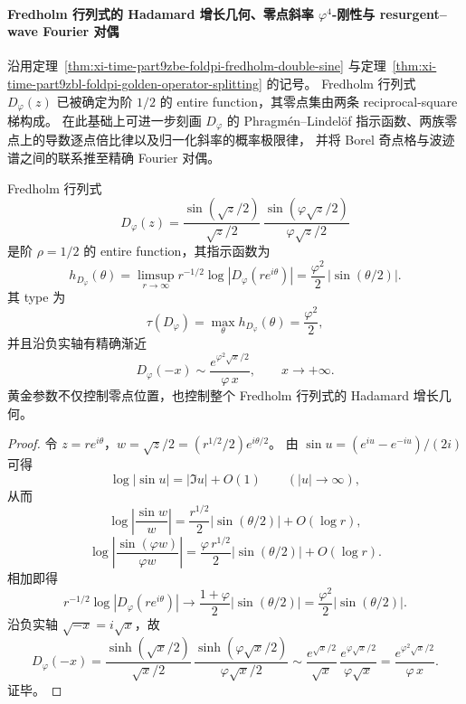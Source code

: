 \paragraph{Fredholm 行列式的 Hadamard 增长几何、零点斜率 \texorpdfstring{$\varphi^4$}{phi4}-刚性与 resurgent--wave Fourier 对偶}
沿用定理~\ref{thm:xi-time-part9zbe-foldpi-fredholm-double-sine}
与定理~\ref{thm:xi-time-part9zbl-foldpi-golden-operator-splitting} 的记号。
Fredholm 行列式 \(D_\varphi(z)\) 已被确定为阶 \(1/2\) 的 entire function，其零点集由两条 reciprocal-square 梯构成。
在此基础上可进一步刻画 \(D_\varphi\) 的 Phragm\'en--Lindel\"of 指示函数、两族零点上的导数逐点倍比律以及归一化斜率的概率极限律，
并将 Borel 奇点格与波迹谱之间的联系推至精确 Fourier 对偶。

\begin{theorem}\label{thm:xi-time-part9zbm-foldpi-hadamard-indicator}
Fredholm 行列式
\[
D_\varphi(z)
=
\frac{\sin(\sqrt z/2)}{\sqrt z/2}\,
\frac{\sin(\varphi\sqrt z/2)}{\varphi\sqrt z/2}
\]
是阶 \(\rho=1/2\) 的 entire function，其指示函数为
\[
h_{D_\varphi}(\theta)
=
\limsup_{r\to\infty}r^{-1/2}\log|D_\varphi(re^{i\theta})|
=
\frac{\varphi^2}{2}\,|\sin(\theta/2)|.
\]
其 type 为
\[
\tau(D_\varphi)=\max_\theta h_{D_\varphi}(\theta)=\frac{\varphi^2}{2},
\]
并且沿负实轴有精确渐近
\[
D_\varphi(-x)\sim \frac{e^{\varphi^2\sqrt x/2}}{\varphi\, x},
\qquad x\to+\infty.
\]
黄金参数不仅控制零点位置，也控制整个 Fredholm 行列式的 Hadamard 增长几何。
\end{theorem}
\begin{proof}
令 \(z=re^{i\theta}\)，\(w=\sqrt z/2=(r^{1/2}/2)e^{i\theta/2}\)。
由 \(\sin u=(e^{iu}-e^{-iu})/(2i)\) 可得
\[
\log|\sin u|=|\Im u|+O(1)\qquad (|u|\to\infty),
\]
从而
\[
\log\left|\frac{\sin w}{w}\right|
=
\frac{r^{1/2}}{2}|\sin(\theta/2)|+O(\log r),
\]
\[
\log\left|\frac{\sin(\varphi w)}{\varphi w}\right|
=
\frac{\varphi\, r^{1/2}}{2}|\sin(\theta/2)|+O(\log r).
\]
相加即得
\[
r^{-1/2}\log|D_\varphi(re^{i\theta})|
\to
\frac{1+\varphi}{2}|\sin(\theta/2)|
=
\frac{\varphi^2}{2}|\sin(\theta/2)|.
\]
沿负实轴 \(\sqrt{-x}=i\sqrt x\)，故
\[
D_\varphi(-x)
=
\frac{\sinh(\sqrt x/2)}{\sqrt x/2}\,
\frac{\sinh(\varphi\sqrt x/2)}{\varphi\sqrt x/2}
\sim
\frac{e^{\sqrt x/2}}{\sqrt x}\,
\frac{e^{\varphi\sqrt x/2}}{\varphi\sqrt x}
=
\frac{e^{\varphi^2\sqrt x/2}}{\varphi\, x}.
\]
证毕。
\end{proof}

